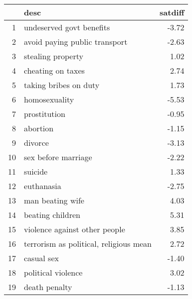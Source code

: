 \documentclass{amsart}
\begin{document}
\begin{table}[ht]
\centering
\begin{tabular}{rlr}
  \hline
 & desc & satdiff \\ 
  \hline
1 & undeserved govt benefits & -3.72 \\ 
  2 & avoid paying public transport & -2.63 \\ 
  3 & stealing property & 1.02 \\ 
  4 & cheating on taxes & 2.74 \\ 
  5 & taking bribes on duty & 1.73 \\ 
  6 & homosexuality & -5.53 \\ 
  7 & prostitution & -0.95 \\ 
  8 & abortion & -1.15 \\ 
  9 & divorce & -3.13 \\ 
  10 & sex before marriage & -2.22 \\ 
  11 & suicide & 1.33 \\ 
  12 & euthanasia & -2.75 \\ 
  13 & man beating wife & 4.03 \\ 
  14 & beating children & 5.31 \\ 
  15 & violence against other people & 3.85 \\ 
  16 & terrorism as political, religious mean & 2.72 \\ 
  17 & casual sex & -1.40 \\ 
  18 & political violence & 3.02 \\ 
  19 & death penalty & -1.13 \\ 
   \hline
\end{tabular}
\end{table}
\end{document}

